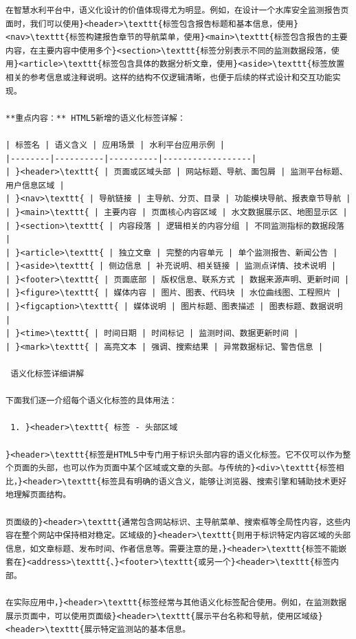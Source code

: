 \begin{lstlisting}
在智慧水利平台中，语义化设计的价值体现得尤为明显。例如，在设计一个水库安全监测报告页面时，我们可以使用}<header>\texttt{标签包含报告标题和基本信息，使用}<nav>\texttt{标签构建报告章节的导航菜单，使用}<main>\texttt{标签包含报告的主要内容，在主要内容中使用多个}<section>\texttt{标签分别表示不同的监测数据段落，使用}<article>\texttt{标签包含具体的数据分析文章，使用}<aside>\texttt{标签放置相关的参考信息或注释说明。这样的结构不仅逻辑清晰，也便于后续的样式设计和交互功能实现。

**重点内容：** HTML5新增的语义化标签详解：

| 标签名 | 语义含义 | 应用场景 | 水利平台应用示例 |
|--------|----------|----------|------------------|
| }<header>\texttt{ | 页面或区域头部 | 网站标题、导航、面包屑 | 监测平台标题、用户信息区域 |
| }<nav>\texttt{ | 导航链接 | 主导航、分页、目录 | 功能模块导航、报表章节导航 |
| }<main>\texttt{ | 主要内容 | 页面核心内容区域 | 水文数据展示区、地图显示区 |
| }<section>\texttt{ | 内容段落 | 逻辑相关的内容分组 | 不同监测指标的数据段落 |
| }<article>\texttt{ | 独立文章 | 完整的内容单元 | 单个监测报告、新闻公告 |
| }<aside>\texttt{ | 侧边信息 | 补充说明、相关链接 | 监测点详情、技术说明 |
| }<footer>\texttt{ | 页面底部 | 版权信息、联系方式 | 数据来源声明、更新时间 |
| }<figure>\texttt{ | 媒体内容 | 图片、图表、代码块 | 水位曲线图、工程照片 |
| }<figcaption>\texttt{ | 媒体说明 | 图片标题、图表描述 | 图表标题、数据说明 |
| }<time>\texttt{ | 时间日期 | 时间标记 | 监测时间、数据更新时间 |
| }<mark>\texttt{ | 高亮文本 | 强调、搜索结果 | 异常数据标记、警告信息 |

 语义化标签详细讲解

下面我们逐一介绍每个语义化标签的具体用法：

 1. }<header>\texttt{ 标签 - 头部区域

}<header>\texttt{标签是HTML5中专门用于标识头部内容的语义化标签。它不仅可以作为整个页面的头部，也可以作为页面中某个区域或文章的头部。与传统的}<div>\texttt{标签相比，}<header>\texttt{标签具有明确的语义含义，能够让浏览器、搜索引擎和辅助技术更好地理解页面结构。

页面级的}<header>\texttt{通常包含网站标识、主导航菜单、搜索框等全局性内容，这些内容在整个网站中保持相对稳定。区域级的}<header>\texttt{则用于标识特定内容区域的头部信息，如文章标题、发布时间、作者信息等。需要注意的是，}<header>\texttt{标签不能嵌套在}<address>\texttt{、}<footer>\texttt{或另一个}<header>\texttt{标签内部。

在实际应用中，}<header>\texttt{标签经常与其他语义化标签配合使用。例如，在监测数据展示页面中，可以使用页面级}<header>\texttt{展示平台名称和导航，使用区域级}<header>\texttt{展示特定监测站的基本信息。
\end{lstlisting}

